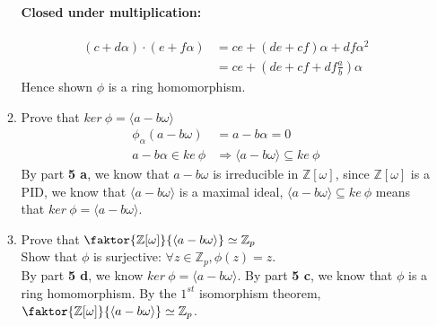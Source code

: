 \documentclass[12pt]{article}
\begin{document}
\begin{enumerate}
\begin{enumerate}
			\paragraph{Closed under multiplication:}
			\begin{align*}
				(c+d\alpha) \cdot (e+f\alpha) &= ce + (de + cf)\alpha + df\alpha^2\\
				&= ce + (de + cf + df\frac{a}{b})\alpha
			\end{align*}
			Hence shown $\phi$ is a ring homomorphism.

		\item Prove that $ker\ \phi = \langle a-b\omega \rangle$
			\begin{align*}
				\phi_\alpha(a-b\omega) &= a-b\alpha = 0\\
				a-b\alpha \in ke\ \phi &\Rightarrow \langle a-b\omega \rangle \subseteq
				ke\ \phi
			\end{align*}
			By part \textbf{5 a}, we know that $a-b\omega$ is irreducible in
				$\mathbb{Z}[\omega]$, since $\mathbb{Z}[\omega]$ is a PID, we know that
				$\langle a-b\omega \rangle$ is a maximal ideal, $\langle a-b\omega
				\rangle \subseteq ke\ \phi$ means that $ker\ \phi = \langle a-b\omega
				\rangle$.

			\item Prove that $\faktor{\mathbb{Z}[\omega]}{\langle a-b\omega \rangle}
				\simeq \mathbb{Z}_p$\\
				Show that $\phi$ is surjective: $\forall z \in \mathbb{Z}_p, \phi(z) =
				z$.\\
				By part \textbf{5 d}, we know $ker\ \phi = \langle a-b\omega \rangle$.
				By part \textbf{5 c}, we know that $\phi$ is a ring homomorphism. By the
				$1^{st}$ isomorphism theorem, $\faktor{\mathbb{Z}[\omega]}{\langle
				a-b\omega \rangle} \simeq \mathbb{Z}_p$.

	\end{enumerate}

\end{enumerate}
\end{document}

